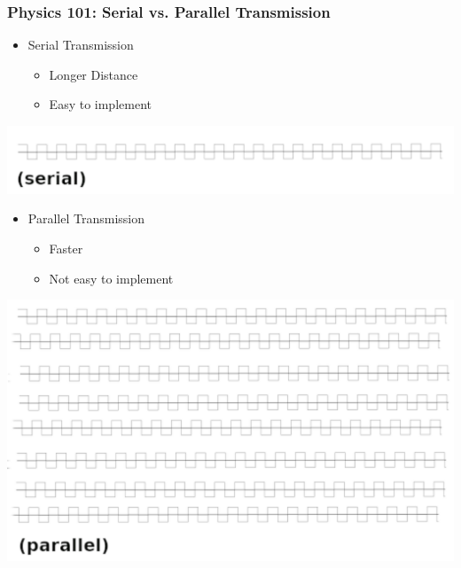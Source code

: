 \documentclass[aspectratio=169, xcolor=table, notheorems, hyperref={pdfpagelabels=false}]{beamer}
\begin{document}
\begin{frame}
\frametitle{Physics 101: Serial vs. Parallel Transmission}
\begin{multicols}{2}
  \begin{itemize}
    \item Serial Transmission
  \begin{itemize}
    \item Longer Distance
    \item Easy to implement
  \end{itemize}
  \end{itemize}
  \includegraphics[width=0.99\linewidth]{os-wave4a}
  \vfill \null
\columnbreak
  \begin{itemize}
    \item Parallel Transmission
  \begin{itemize}
    \item Faster
    \item Not easy to implement
  \end{itemize}
  \end{itemize}
  \includegraphics[width=0.99\linewidth]{os-wave4b}
  \vfill \null
\end{multicols}
\end{frame}
\end{document}
